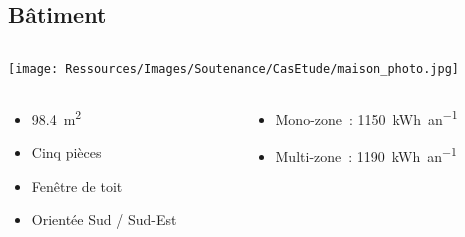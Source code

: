 \documentclass[xcolor=x11names, compress, 11pt]{beamer}
\begin{document}
\subsection{Bâtiment}
\begin{frame}[noframenumbering, c]
    \vfill
    \centering
    \begin{columns}
        \begin{column}{0.4\textwidth}
            \texttt{[image: Ressources/Images/Soutenance/CasEtude/maison\_photo.jpg]}
        \end{column}
        \begin{column}{0.6\textwidth}
        \end{column}
    \end{columns}
    \vfill
    \begin{columns}
        \begin{column}{0.6\textwidth}
            \centering
            \begin{itemize}
                \item \SI{98.4}{\metre\squared}
                \item Cinq pièces
                \item Fenêtre de toit
                \item Orientée Sud / Sud-Est
            \end{itemize}
        \end{column}%
        \begin{column}{0.7\textwidth}
            \centering
            \begin{itemize}
                \item<3-> Mono-zone~: \SI{1150}{kWh\per an}
                \item<3-> Multi-zone~: \SI{1190}{kWh\per an}
            \end{itemize}
        \end{column}%
    \end{columns}%
    \vfill
\end{frame}




\end{document}
